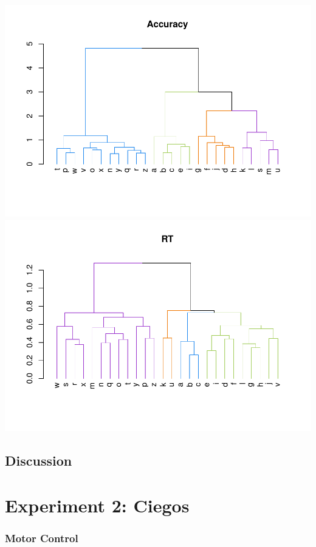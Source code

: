\documentclass[
  english,
  man]{apa7}
\begin{document}
\includegraphics{BF_ms_1_files/figure-latex/Dendrograms with color sighted -1.pdf} \includegraphics{BF_ms_1_files/figure-latex/Dendrograms with color sighted -2.pdf}

\hypertarget{discussion}{%
\subsection{Discussion}\label{discussion}}

\hypertarget{experiment-2-ciegos}{%
\section{Experiment 2: Ciegos}\label{experiment-2-ciegos}}

\hypertarget{motor-control}{%
\subsubsection{Motor Control}\label{motor-control}}
\end{document}
